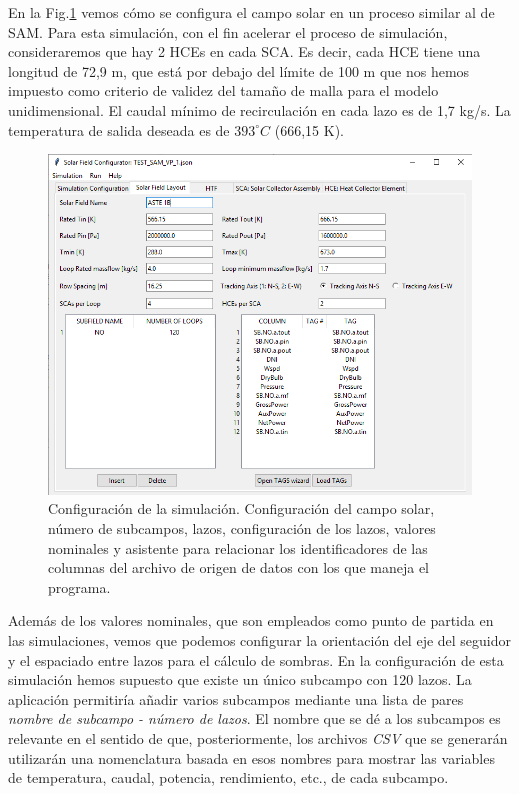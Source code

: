 En la Fig.\ref{fig:interface02} vemos cómo se configura el campo solar en un proceso similar al de SAM. Para esta simulación, con el fin acelerar el proceso de simulación, consideraremos que hay 2 HCEs en cada SCA. Es decir, cada HCE tiene una longitud de 72,9 m, que está por debajo del límite de 100 m que nos hemos impuesto como criterio de validez del tamaño de malla para el modelo unidimensional.  El caudal mínimo de recirculación en cada lazo es de 1,7 kg/s. La temperatura de salida deseada es de $393 ^\circ C$ (666,15 K).

\begin{figure}[H]
\includegraphics[width=0.9\linewidth]{images/interface02.png}
\caption[Configuración de la simulación del campo solar]{Configuración de la simulación. Configuración del campo solar, número de subcampos, lazos, configuración de los lazos, valores nominales y asistente para relacionar los identificadores de las columnas del archivo de origen de datos con los que maneja el programa.} 
\label{fig:interface02}
\end{figure}

Además de los valores nominales, que son empleados como punto de partida en las simulaciones, vemos que podemos configurar la orientación del eje del seguidor y el espaciado entre lazos para el cálculo de sombras. En la configuración de esta simulación hemos supuesto que existe un único subcampo con 120 lazos. La aplicación permitiría añadir varios subcampos mediante una lista de pares \emph{nombre de subcampo - número de lazos}. El nombre que se dé a los subcampos es relevante en el sentido de que, posteriormente, los archivos \emph{CSV} que se generarán  utilizarán una nomenclatura basada en esos nombres para mostrar las variables de temperatura, caudal, potencia, rendimiento, etc., de cada subcampo. 

